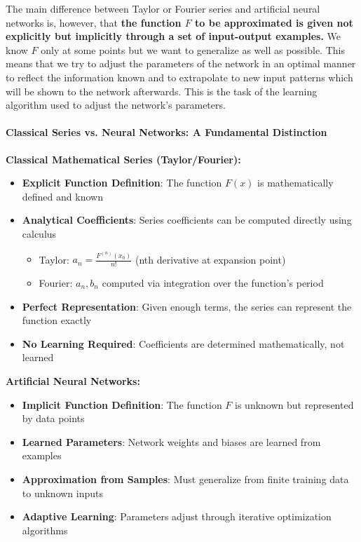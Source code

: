 The main difference between Taylor or Fourier series and artificial neural networks is, however, that \textbf{the function $F$ to be approximated is given not explicitly but implicitly through a set of input-output examples.} We know $F$ only at some points but we want to generalize as well as possible. This means that we try to adjust the parameters of the network in an optimal manner to reflect the information known and to extrapolate to new input patterns which will be shown to the network afterwards. This is the task of the learning algorithm used to adjust the network's parameters.

\paragraph{Classical Series vs. Neural Networks: A Fundamental Distinction}

\textbf{Classical Mathematical Series (Taylor/Fourier):}

\begin{itemize}
\item \textbf{Explicit Function Definition}: The function $F(x)$ is mathematically defined and known
\item \textbf{Analytical Coefficients}: Series coefficients can be computed directly using calculus
\begin{itemize}
\item Taylor: $a_n = \frac{F^{(n)}(x_0)}{n!}$ (nth derivative at expansion point)
\item Fourier: $a_n, b_n$ computed via integration over the function's period
\end{itemize}
\item \textbf{Perfect Representation}: Given enough terms, the series can represent the function exactly
\item \textbf{No Learning Required}: Coefficients are determined mathematically, not learned
\end{itemize}

\textbf{Artificial Neural Networks:}

\begin{itemize}
\item \textbf{Implicit Function Definition}: The function $F$ is unknown but represented by data points
\item \textbf{Learned Parameters}: Network weights and biases are learned from examples
\item \textbf{Approximation from Samples}: Must generalize from finite training data to unknown inputs
\item \textbf{Adaptive Learning}: Parameters adjust through iterative optimization algorithms
\end{itemize}

